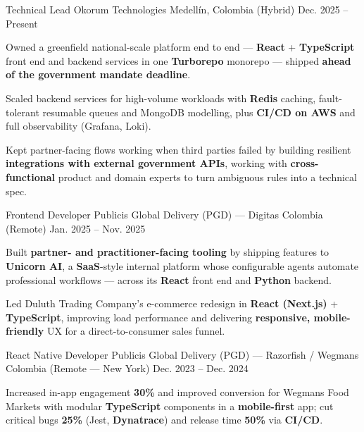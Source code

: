 \newcommand{\quotes}[1]{``#1''}

\begin{cventries}

  \cventry
  {Technical Lead}
  {Okorum Technologies}
  {Medellín, Colombia (Hybrid)}
  {Dec. 2025 -- Present}
  {
    \begin{cvitems}
      \item {Owned a greenfield national-scale platform end to end --- \textbf{React} + \textbf{TypeScript} front end and backend services in one \textbf{Turborepo} monorepo --- shipped \textbf{ahead of the government mandate deadline}.}
      \item {Scaled backend services for high-volume workloads with \textbf{Redis} caching, fault-tolerant resumable queues and MongoDB modelling, plus \textbf{CI/CD on AWS} and full observability (Grafana, Loki).}
      \item {Kept partner-facing flows working when third parties failed by building resilient \textbf{integrations with external government APIs}, working with \mbox{\textbf{cross-functional}} product and domain experts to turn ambiguous rules into a technical spec.}
    \end{cvitems}
  }

  \cventry
  {Frontend Developer}
  {Publicis Global Delivery (PGD) — Digitas}
  {Colombia (Remote)}
  {Jan. 2025 -- Nov. 2025}
  {
    \begin{cvitems}
      \item {Built \textbf{partner- and practitioner-facing tooling} by shipping features to \textbf{Unicorn AI}, a \textbf{SaaS}-style internal platform whose configurable agents automate professional workflows --- across its \textbf{React} front end and \textbf{Python} backend.}
      \item {Led Duluth Trading Company's e-commerce redesign in \textbf{React (Next.js)} + \textbf{TypeScript}, improving load performance and delivering \textbf{responsive, mobile-friendly} UX for a direct-to-consumer sales funnel.}
    \end{cvitems}
  }

  \cventry
  {React Native Developer}
  {Publicis Global Delivery (PGD) — Razorfish / Wegmans}
  {Colombia (Remote — New York)}
  {Dec. 2023 -- Dec. 2024}
  {
    \begin{cvitems}
      \item {Increased in-app engagement \textbf{30\%} and improved conversion for Wegmans Food Markets with modular \textbf{TypeScript} components in a \textbf{mobile-first} app; cut critical bugs \textbf{25\%} (Jest, \textbf{Dynatrace}) and release time \textbf{50\%} via \textbf{CI/CD}.}
    \end{cvitems}
  }


\end{cventries}
